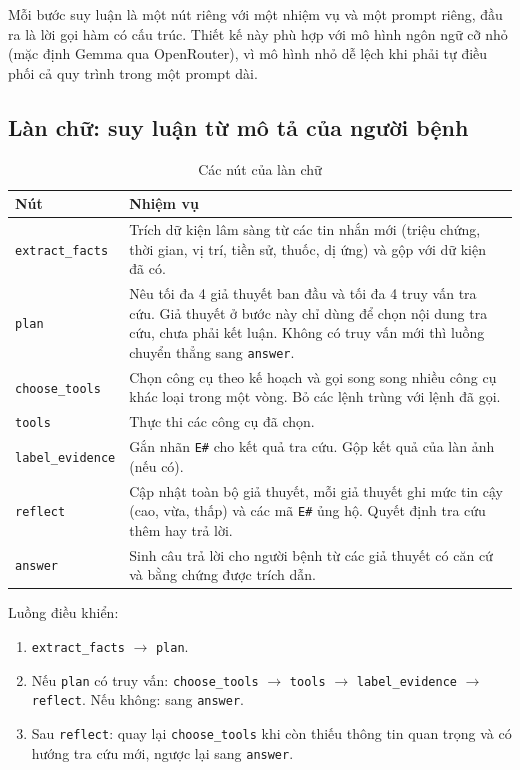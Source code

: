 Mỗi bước suy luận là một nút riêng với một nhiệm vụ và một prompt riêng, đầu ra là lời gọi hàm có cấu trúc. Thiết kế này phù hợp với mô hình ngôn ngữ cỡ nhỏ (mặc định Gemma qua OpenRouter), vì mô hình nhỏ dễ lệch khi phải tự điều phối cả quy trình trong một prompt dài.

\subsection{Làn chữ: suy luận từ mô tả của người bệnh}

\begin{table}[H]
\centering
\caption{Các nút của làn chữ}
\label{tab:nut-lan-chu}
\small
\begin{tabular}{|p{3.0cm}|p{11.0cm}|}
\hline
\textbf{Nút} & \textbf{Nhiệm vụ} \\ \hline
\texttt{extract\_facts} & Trích dữ kiện lâm sàng từ các tin nhắn mới (triệu chứng, thời gian, vị trí, tiền sử, thuốc, dị ứng) và gộp với dữ kiện đã có. \\ \hline
\texttt{plan} & Nêu tối đa 4 giả thuyết ban đầu và tối đa 4 truy vấn tra cứu. Giả thuyết ở bước này chỉ dùng để chọn nội dung tra cứu, chưa phải kết luận. Không có truy vấn mới thì luồng chuyển thẳng sang \texttt{answer}. \\ \hline
\texttt{choose\_tools} & Chọn công cụ theo kế hoạch và gọi song song nhiều công cụ khác loại trong một vòng. Bỏ các lệnh trùng với lệnh đã gọi. \\ \hline
\texttt{tools} & Thực thi các công cụ đã chọn. \\ \hline
\texttt{label\_evidence} & Gắn nhãn \texttt{E\#} cho kết quả tra cứu. Gộp kết quả của làn ảnh (nếu có). \\ \hline
\texttt{reflect} & Cập nhật toàn bộ giả thuyết, mỗi giả thuyết ghi mức tin cậy (cao, vừa, thấp) và các mã \texttt{E\#} ủng hộ. Quyết định tra cứu thêm hay trả lời. \\ \hline
\texttt{answer} & Sinh câu trả lời cho người bệnh từ các giả thuyết có căn cứ và bằng chứng được trích dẫn. \\ \hline
\end{tabular}
\end{table}

Luồng điều khiển:
\begin{enumerate}
  \item \texttt{extract\_facts} $\rightarrow$ \texttt{plan}.
  \item Nếu \texttt{plan} có truy vấn: \texttt{choose\_tools} $\rightarrow$ \texttt{tools} $\rightarrow$ \texttt{label\_evidence} $\rightarrow$ \texttt{reflect}. Nếu không: sang \texttt{answer}.
  \item Sau \texttt{reflect}: quay lại \texttt{choose\_tools} khi còn thiếu thông tin quan trọng và có hướng tra cứu mới, ngược lại sang \texttt{answer}.
\end{enumerate}


